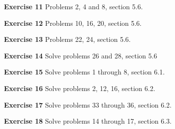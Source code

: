 \documentclass[12pt,oneside]{exam}
\newenvironment{exercise}[1]{\vspace{.1in}\noindent\textbf{Exercise #1 \hspace{.05em}}}{}
\begin{document}
\begin{exercise}{11}
Problems 2,  4 and 8, section 5.6.  
\end{exercise}

\begin{exercise}{12} 
Problems 10, 16, 20, section 5.6. 
\end{exercise}

\begin{exercise}{13} 
Problems 22, 24, section 5.6. 
\end{exercise}

\begin{exercise}{14}
Solve problems 26 and 28, section 5.6
\end{exercise}

\begin{exercise}{15}
Solve problems 1 through 8, section 6.1. 
\end{exercise}

\begin{exercise}{16} 
Solve problems 2, 12, 16, section 6.2.
\end{exercise}

\begin{exercise}{17} 
Solve problems 33 through 36, section 6.2.
\end{exercise}

\begin{exercise}{18}
Solve problems 14 through 17, section 6.3. 
\end{exercise}
\end{document}
